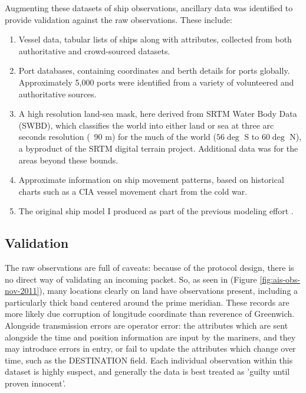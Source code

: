 Augmenting these datasets of ship observations, ancillary data was identified to provide validation against the raw observations. These include: 

\begin{enumerate}
  \item Vessel data, tabular lists of ships along with attributes, collected from both authoritative and crowd-sourced datasets.
  \item Port databases, containing coordinates and berth details for ports globally. Approximately 5,000 ports were identified from a variety of volunteered and authoritative sources.
  \item A high resolution land-sea mask, here derived from SRTM Water Body Data (SWBD), which classifies the world into either land or sea at three arc seconds resolution (~90 m) for the much of the world ($56\deg$ S to $60\deg$ N), a byproduct of the SRTM digital terrain project\cite{rabus2003shuttle}. Additional data was for the areas beyond these bounds.
  \item Approximate information on ship movement patterns, based on historical charts such as a CIA vessel movement chart from the cold war.
  \item The original ship model I produced as part of the previous modeling effort \citep{Halpern2008}.
\end{enumerate}

\subsection{Validation}

The raw observations are full of caveats: because of the protocol design, there is no direct way of validating an incoming packet. So, as seen in (Figure \ref{fig:ais-obs-nov-2011}), many locations clearly on land have observations present, including a particularly thick band centered around the prime meridian. These records are more likely due corruption of longitude coordinate than reverence of Greenwich. Alongside transmission errors are operator error: the attributes which are sent alongside the time and position information are input by the mariners, and they may introduce errors in entry, or fail to update the attributes which change over time, such as the DESTINATION field. Each individual observation within this dataset is highly suspect, and generally the data is best treated as 'guilty until proven innocent'.

